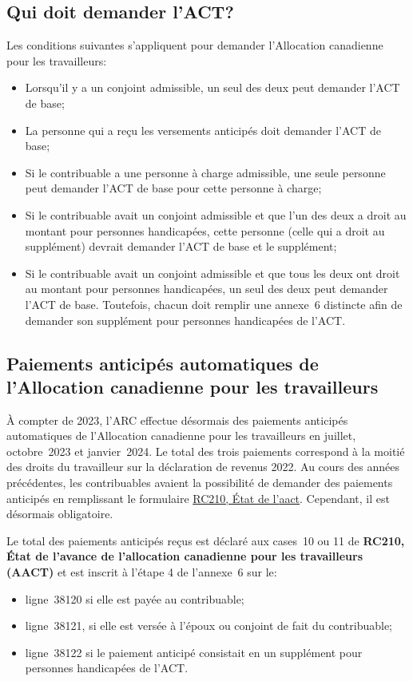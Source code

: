 \subsection{Qui doit demander l'ACT?}
Les conditions suivantes s'appliquent pour demander l'Allocation canadienne pour les travailleurs:
\begin{itemize}
	\item Lorsqu'il y a un conjoint admissible, un seul des deux peut demander l'ACT de base;
	\item La personne qui a reçu les versements anticipés doit demander l'ACT de base;
	\item Si le contribuable a une personne à charge admissible, une seule personne peut demander l'ACT de base pour cette personne à charge;
	\item Si le contribuable avait un conjoint admissible et que l'un des deux a droit au montant pour personnes handicapées, cette personne (celle qui a droit au supplément) devrait demander l'ACT de base et le supplément;
	\item Si le contribuable avait un conjoint admissible et que tous les deux ont droit au montant pour personnes handicapées, un seul des deux peut demander l'ACT de base. Toutefois, chacun doit remplir une annexe~6 distincte afin de demander son supplément pour personnes handicapées de l'ACT.
\end{itemize}


\subsection{Paiements anticipés automatiques de l'Allocation canadienne pour les travailleurs}
À compter de 2023, l'ARC effectue désormais des paiements anticipés automatiques de l'Allocation canadienne pour les travailleurs en juillet, octobre~2023 et janvier~2024. Le total des trois paiements correspond à la moitié des droits du travailleur sur la déclaration de revenus 2022. Au cours des années précédentes, les contribuables avaient la possibilité de demander des paiements anticipés en remplissant le formulaire \href{https://www.canada.ca/fr/agence-revenu/services/prestations-enfants-familles/allocation-canadienne-travailleurs/rc210-etat-versements-anticipes-prestation-fiscale-revenu-travail.html}{RC210, État de l'\acrfull{aact}}. Cependant, il est désormais obligatoire.

Le total des paiements anticipés reçus est déclaré aux cases~10 ou 11 de \textbf{RC210, État de l'avance de l'allocation canadienne pour les travailleurs (AACT)} et est inscrit à l'étape 4 de l'annexe~6 sur le:
\begin{itemize}
	\item ligne~38120 si elle est payée au contribuable;
	\item ligne~38121, si elle est versée à l'époux ou conjoint de fait du contribuable;
	\item ligne~38122 si le paiement anticipé consistait en un supplément pour personnes handicapées de l'ACT.
\end{itemize}

